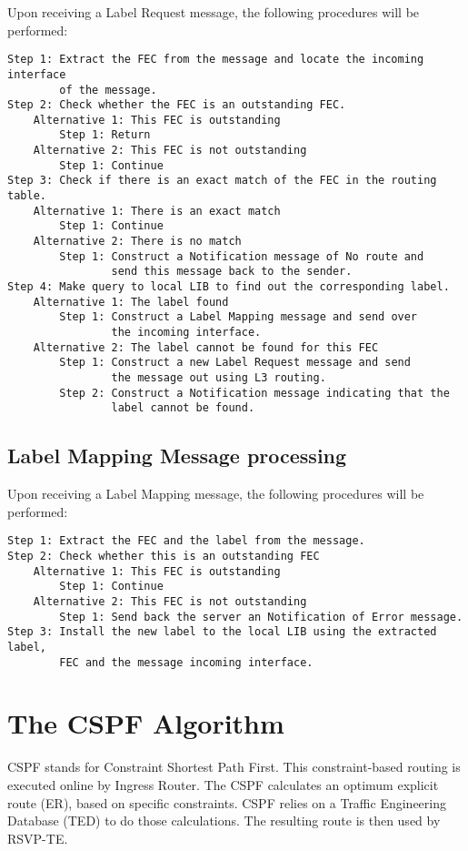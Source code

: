 Upon receiving a Label Request message, the following procedures will be
performed:

\begin{verbatim}
Step 1: Extract the FEC from the message and locate the incoming interface
        of the message.
Step 2: Check whether the FEC is an outstanding FEC.
    Alternative 1: This FEC is outstanding
        Step 1: Return
    Alternative 2: This FEC is not outstanding
        Step 1: Continue
Step 3: Check if there is an exact match of the FEC in the routing table.
    Alternative 1: There is an exact match
        Step 1: Continue
    Alternative 2: There is no match
        Step 1: Construct a Notification message of No route and
                send this message back to the sender.
Step 4: Make query to local LIB to find out the corresponding label.
    Alternative 1: The label found
        Step 1: Construct a Label Mapping message and send over
                the incoming interface.
    Alternative 2: The label cannot be found for this FEC
        Step 1: Construct a new Label Request message and send
                the message out using L3 routing.
        Step 2: Construct a Notification message indicating that the
                label cannot be found.
\end{verbatim}

\subsection{Label Mapping Message processing}

Upon receiving a Label Mapping message, the following procedures will be
performed:

\begin{verbatim}
Step 1: Extract the FEC and the label from the message.
Step 2: Check whether this is an outstanding FEC
    Alternative 1: This FEC is outstanding
        Step 1: Continue
    Alternative 2: This FEC is not outstanding
        Step 1: Send back the server an Notification of Error message.
Step 3: Install the new label to the local LIB using the extracted label,
        FEC and the message incoming interface.
\end{verbatim}

\section{The CSPF Algorithm}

CSPF stands for Constraint Shortest Path First.
This constraint-based routing is executed online by Ingress Router.
The CSPF calculates an optimum explicit route (ER), based on
specific constraints. CSPF relies on a Traffic Engineering Database (TED)
to do those calculations. The resulting route is then used by RSVP-TE.

